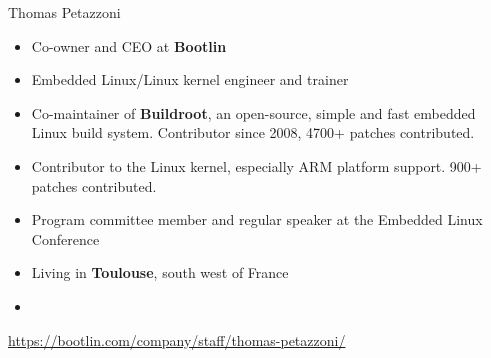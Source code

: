 \begin{frame}{Thomas Petazzoni}
  \begin{itemize}
  \item Co-owner and CEO at {\bf Bootlin}
  \item Embedded Linux/Linux kernel engineer and trainer
  \item Co-maintainer of {\bf Buildroot}, an open-source, simple and
    fast embedded Linux build system. Contributor since 2008, 4700+
    patches contributed.
  \item Contributor to the Linux kernel, especially ARM platform
    support. 900+ patches contributed.
  \item Program committee member and regular speaker at the Embedded
    Linux Conference
  \item Living in {\bf Toulouse}, south west of France
  \item {}
  \end{itemize}
  {\small \url{https://bootlin.com/company/staff/thomas-petazzoni/}}
\end{frame}
